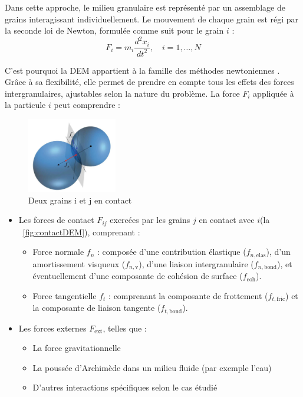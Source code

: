 \documentclass[a4paper,12pt]{report}
\begin{document}
Dans cette approche, le milieu granulaire est représenté par un assemblage de grains interagissant individuellement. Le mouvement de chaque grain est régi par la seconde loi de Newton, formulée comme suit pour le grain $i$ :
\begin{equation}
    F_i = m_i \dfrac{d^2x_i}{dt^2}, \quad i = 1,\dots,N
    \label{eq:DEMequation}
\end{equation}

C’est pourquoi la DEM appartient à la famille des méthodes newtoniennes \citep{radjai2011discrete}. Grâce à sa flexibilité, elle permet de prendre en compte tous les effets des forces intergranulaires, ajustables selon la nature du problème. La force $F_i$ appliquée à la particule $i$ peut comprendre :

\begin{figure}[h!]
\centering
\includegraphics[width=0.35\textwidth]{DEM.jpg}
\caption{Deux grains i et j en contact}
\label{fig:contactDEM}
\end{figure}

\begin{itemize}[label=$\bullet$]
    \item Les forces de contact $F_{ij}$ exercées par les grains $j$ en contact avec $i$(la ~\autoref{fig:contactDEM}), comprenant :
    \begin{itemize}[label=$\cdot$]
        \item Force normale $f_n$ : composée d’une contribution élastique ($f_{n,\mathrm{elas}}$), d’un amortissement visqueux ($f_{n,\mathrm{v}}$), d’une liaison intergranulaire ($f_{n,\mathrm{bond}}$), et éventuellement d’une composante de cohésion de surface ($f_{\mathrm{coh}}$).
        \item Force tangentielle $f_t$ : comprenant la composante de frottement ($f_{t,\mathrm{fric}}$) et la composante de liaison tangente ($f_{t,\mathrm{bond}}$).
    \end{itemize}
    
    \item Les forces externes $F_{\mathrm{ext}}$, telles que :
    \begin{itemize}[label=$\cdot$]
        \item La force gravitationnelle
        \item La poussée d’Archimède dans un milieu fluide (par exemple l’eau)
        \item D'autres interactions spécifiques selon le cas étudié
    \end{itemize}
\end{itemize}
\end{document}
